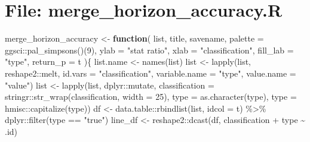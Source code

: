 \documentclass[
]{article}
\newenvironment{Shaded}{\begin{snugshade}}{\end{snugshade}}
\newcommand{\AttributeTok}[1]{\textcolor[rgb]{0.77,0.63,0.00}{#1}}
\newcommand{\ControlFlowTok}[1]{\textcolor[rgb]{0.13,0.29,0.53}{\textbf{#1}}}
\newcommand{\DecValTok}[1]{\textcolor[rgb]{0.00,0.00,0.81}{#1}}
\newcommand{\FunctionTok}[1]{\textcolor[rgb]{0.00,0.00,0.00}{#1}}
\newcommand{\NormalTok}[1]{#1}
\newcommand{\OtherTok}[1]{\textcolor[rgb]{0.56,0.35,0.01}{#1}}
\newcommand{\SpecialCharTok}[1]{\textcolor[rgb]{0.00,0.00,0.00}{#1}}
\newcommand{\StringTok}[1]{\textcolor[rgb]{0.31,0.60,0.02}{#1}}
\begin{document}
\hypertarget{file-merge_horizon_accuracy.r}{%
\section{File: merge\_horizon\_accuracy.R}\label{file-merge_horizon_accuracy.r}}

\begin{Shaded}
\begin{Highlighting}[]
\NormalTok{merge\_horizon\_accuracy }\OtherTok{\textless{}{-}} 
  \ControlFlowTok{function}\NormalTok{(}
\NormalTok{           list,}
\NormalTok{           title,}
\NormalTok{           savename,}
           \AttributeTok{palette =}\NormalTok{ ggsci}\SpecialCharTok{::}\FunctionTok{pal\_simpsons}\NormalTok{()(}\DecValTok{9}\NormalTok{),}
           \AttributeTok{ylab =} \StringTok{"stat ratio"}\NormalTok{,}
           \AttributeTok{xlab =} \StringTok{"classification"}\NormalTok{,}
           \AttributeTok{fill\_lab =} \StringTok{"type"}\NormalTok{,}
           \AttributeTok{return\_p =}\NormalTok{ t}
\NormalTok{           )\{}
\NormalTok{    list.name }\OtherTok{\textless{}{-}} \FunctionTok{names}\NormalTok{(list)}
\NormalTok{    list }\OtherTok{\textless{}{-}} \FunctionTok{lapply}\NormalTok{(list, reshape2}\SpecialCharTok{::}\NormalTok{melt,}
                   \AttributeTok{id.vars =} \StringTok{"classification"}\NormalTok{,}
                   \AttributeTok{variable.name =} \StringTok{"type"}\NormalTok{,}
                   \AttributeTok{value.name =} \StringTok{"value"}\NormalTok{)}
\NormalTok{    list }\OtherTok{\textless{}{-}} \FunctionTok{lapply}\NormalTok{(list, dplyr}\SpecialCharTok{::}\NormalTok{mutate,}
                   \AttributeTok{classification =}\NormalTok{ stringr}\SpecialCharTok{::}\FunctionTok{str\_wrap}\NormalTok{(classification, }\AttributeTok{width =} \DecValTok{25}\NormalTok{),}
                   \AttributeTok{type =} \FunctionTok{as.character}\NormalTok{(type),}
                   \AttributeTok{type =}\NormalTok{ hmisc}\SpecialCharTok{::}\FunctionTok{capitalize}\NormalTok{(type))}
\NormalTok{    df }\OtherTok{\textless{}{-}}\NormalTok{ data.table}\SpecialCharTok{::}\FunctionTok{rbindlist}\NormalTok{(list, }\AttributeTok{idcol =}\NormalTok{ t) }\SpecialCharTok{\%\textgreater{}\%} 
\NormalTok{      dplyr}\SpecialCharTok{::}\FunctionTok{filter}\NormalTok{(type }\SpecialCharTok{==} \StringTok{"true"}\NormalTok{)}
\NormalTok{    line\_df }\OtherTok{\textless{}{-}}\NormalTok{ reshape2}\SpecialCharTok{::}\FunctionTok{dcast}\NormalTok{(df, classification }\SpecialCharTok{+}\NormalTok{ type }\SpecialCharTok{\textasciitilde{}}\NormalTok{ .id)}

\end{Highlighting}
\end{Shaded}
\end{document}
